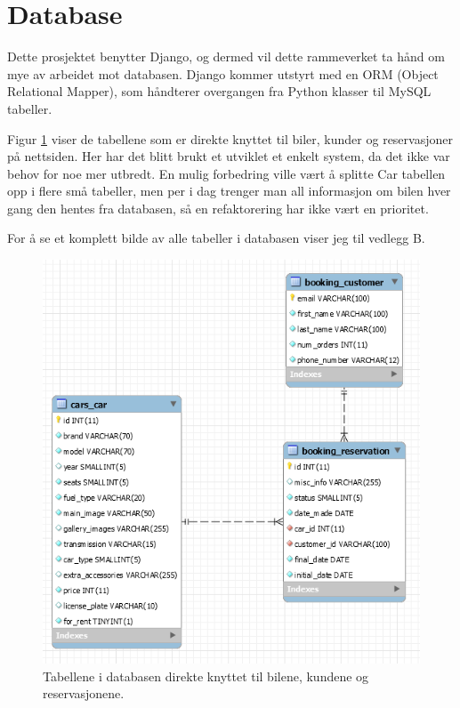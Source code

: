 \newpage


\section{Database}
Dette prosjektet benytter Django, og dermed vil dette rammeverket ta hånd om mye av arbeidet mot databasen. Django kommer utstyrt med en ORM (Object Relational Mapper), som håndterer overgangen fra Python klasser til MySQL tabeller.
 
Figur \ref{fig:tables} viser de tabellene som er direkte knyttet til biler, kunder og reservasjoner på nettsiden. Her har det blitt brukt et utviklet et enkelt system, da det ikke var behov for noe mer utbredt. En mulig forbedring ville vært å splitte Car tabellen opp i flere små tabeller, men per i dag trenger man all informasjon om bilen hver gang den hentes fra databasen, så en refaktorering har ikke vært en prioritet. 

For å se et komplett bilde av alle tabeller i databasen viser jeg til vedlegg B.

 \begin{figure}[htbp]
	\centering
		\includegraphics[scale=0.7]{Bilder/db01.png}
	\caption[Tabellene i Database]{Tabellene i databasen direkte knyttet til bilene, kundene og reservasjonene. } %
	\label{fig:tables}
\end{figure}



